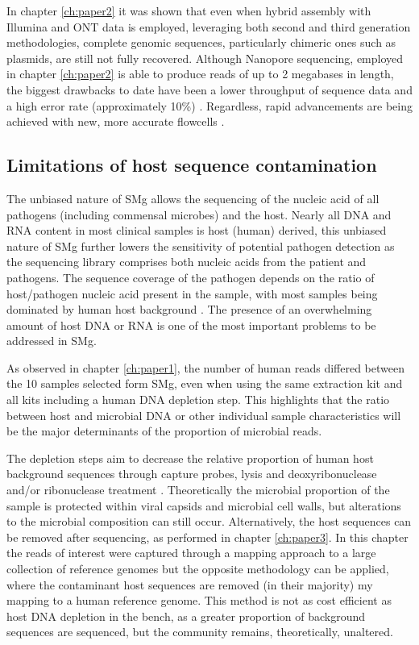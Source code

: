 In chapter \ref{ch:paper2} it was shown that even when hybrid assembly with Illumina and \ac{ONT} data is employed, leveraging both second and third generation methodologies, complete genomic sequences, particularly chimeric ones such as plasmids, are still not fully recovered. Although Nanopore sequencing, employed in chapter \ref{ch:paper2} is able to produce reads of up to 2 megabases in length, the biggest drawbacks to date have been a lower throughput of sequence data and a high error rate (approximately 10\%) \citep{petersen_third-generation_2019}. Regardless, rapid advancements are being achieved with new, more accurate flowcells \citep{sereika_oxford_2021}. 

\subsection{Limitations of host sequence contamination}

The unbiased nature of \ac{SMg} allows the sequencing of the nucleic acid of all pathogens (including commensal microbes) and the host. Nearly all \ac{DNA} and \ac{RNA} content in most clinical samples is host (human) derived, this unbiased nature of SMg further lowers the sensitivity of potential pathogen detection as the sequencing library comprises both nucleic acids from the patient and pathogens. The sequence coverage of the pathogen depends on the ratio of host/pathogen nucleic acid present in the sample, with most samples being dominated by human host background \citep{gu_clinical_2019}. The presence of an overwhelming amount of host \ac{DNA} or \ac{RNA} is one of the most important problems to be addressed in \ac{SMg}.

As observed in chapter \ref{ch:paper1}, the number of human reads differed between the 10 samples selected form \ac{SMg}, even when using the same extraction kit and all kits including a human DNA depletion step. This highlights that the ratio between host and microbial DNA or other individual sample characteristics will be the major determinants of the proportion of microbial reads.

The depletion steps aim to decrease the relative proportion of human host background sequences through capture probes, lysis and deoxyribonuclease and/or ribonuclease treatment \citep{gu_clinical_2019}. Theoretically the microbial proportion of the sample is protected within viral capsids and microbial cell walls, but alterations to the microbial composition can still occur. Alternatively, the host sequences can be removed after sequencing, as performed in chapter \ref{ch:paper3}. In this chapter the reads of interest were captured through a mapping approach to a large collection of reference genomes but the opposite methodology can be applied, where the contaminant host sequences are removed (in their majority) my mapping to a human reference genome. This method is not as cost efficient as host DNA depletion in the bench, as a greater proportion of background sequences are sequenced, but the community remains, theoretically, unaltered. 

